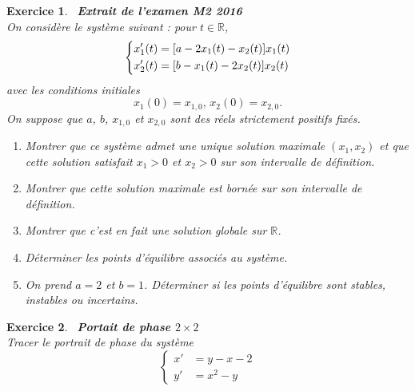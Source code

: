 \documentclass[11pt]{article}
\theoremstyle{exostyle}
\newtheorem{exercice}{Exercice}
\begin{document}
\begin{exercice}~{\bf Extrait de l'examen M2 2016}\\  %
On consid\`ere le syst\`eme suivant : pour $t \in \mathbb{R}$,
$$
\left\{
\aligned
x_1'(t)&=[a-2x_1(t)-x_2(t)]x_1(t)\\
x_2'(t)&=[b-x_1(t)-2x_2(t)] x_2(t)
\endaligned
\right.
$$
avec les conditions initiales
$$
x_1(0)=x_{1,0},\,x_2(0)=x_{2,0}.
$$
On suppose que $a$, $b$, $x_{1,0}$ et $x_{2,0}$ sont des r\'eels strictement positifs fix\'es.
\begin{enumerate}
\item  Montrer que ce syst\`eme admet une unique solution maximale $(x_1,x_2)$ et que cette solution satisfait $x_1>0$ et $x_2>0$ sur son intervalle de d\'efinition.
\item Montrer que cette solution maximale est born\'ee sur son intervalle de d\'efinition. 
\item  Montrer que c'est en fait une solution globale sur $\mathbb{R}$.
\item  D\'eterminer les points d'\'equilibre associ\'es au syst\`eme.
\item  On prend $a=2$ et $b=1$. D\'eterminer si les points d'\'equilibre sont stables, instables ou incertains.
\end{enumerate}
\end{exercice}
\medskip

\begin{exercice}~{\bf Portait de phase $2\times 2$}\\
Tracer le portrait de phase du système
$$
\left\{ 
\begin{aligned}
x' &=  y-x-2 \\
y' &=  x^2 -y
\end{aligned}
\right.
$$
\end{exercice}
\medskip
\end{document}
